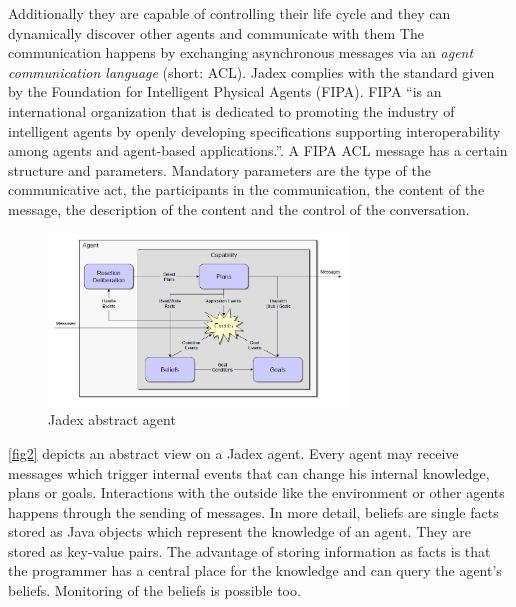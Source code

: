 Additionally they are capable of controlling their life cycle and they can dynamically discover other agents and communicate with them
The communication happens by exchanging asynchronous messages via an \emph{agent communication language} (short: ACL). Jadex complies with the standard given by the Foundation for Intelligent Physical Agents (FIPA). FIPA ``is an international organization that is dedicated to promoting the industry of intelligent agents by openly developing specifications supporting interoperability among agents and agent-based applications.''\cite{FIPA}. A FIPA ACL message has a certain structure and parameters. Mandatory parameters are the type of the communicative act, the participants in the communication, the content of the message, the description of the content and the control of the conversation. %

\begin{figure}
	\centering
	\includegraphics[width=300px]{images/Jadex_agent.png}
	\caption{Jadex abstract agent \cite{pokahr_jadex_2005}}
	\label{fig2}
\end{figure}
\autoref{fig2} depicts an abstract view on a Jadex agent. Every agent may receive messages which trigger internal events that can change his internal knowledge, plans or goals. Interactions with the outside like the environment or other agents happens through the sending of messages. %
In more detail, beliefs are single facts stored as Java objects which represent the knowledge of an agent. %
They are stored as key-value pairs.
The advantage of storing information as facts is that the programmer has a central place for the knowledge and can query the agent's beliefs. %
Monitoring of the beliefs is possible too.

